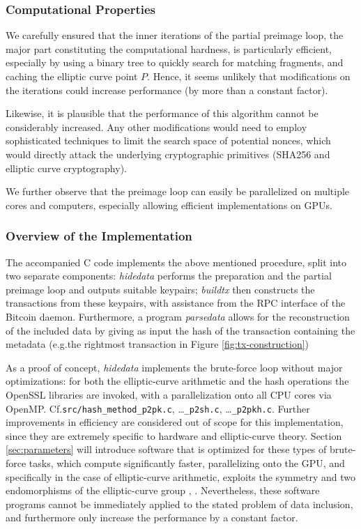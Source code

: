 \documentclass[a4paper,11pt,titlepage]{scrbook}
\begin{document}
\subsubsection*{Computational Properties}

We carefully ensured that the inner iterations of the partial preimage loop, the major part constituting the computational hardness, is particularly efficient, especially by using a binary tree to quickly search for matching fragments, and caching the elliptic curve point $P$.
Hence, it seems unlikely that modifications on the iterations could increase performance (by more than a constant factor).

Likewise, it is plausible that the performance of this algorithm cannot be considerably increased.
Any other modifications would need to employ sophisticated techniques to limit the search space of potential nonces, which would directly attack the underlying cryptographic primitives (SHA256 and elliptic curve cryptography).

We further observe that the preimage loop can easily be parallelized on multiple cores and computers, especially allowing efficient implementations on GPUs.

\subsubsection*{Overview of the Implementation}

The accompanied C code implements the above mentioned procedure, split into two separate components: \emph{hidedata} performs the preparation and the partial preimage loop and outputs suitable keypairs; \emph{buildtx} then constructs the transactions from these keypairs, with assistance from the RPC interface of the Bitcoin daemon.
Furthermore, a program \emph{parsedata} allows for the reconstruction of the included data by giving as input the hash of the transaction containing the metadata (e.g.\@ the rightmost transaction in Figure \ref{fig:tx-construction})

As a proof of concept, \emph{hidedata} implements the brute-force loop without major optimizations: for both the elliptic-curve arithmetic and the hash operations the OpenSSL libraries are invoked, with a parallelization onto all CPU cores via OpenMP. Cf.\@ \texttt{src/hash\_method\allowbreak\_p2pk.c}, \dots\texttt{\_p2sh.c}, \dots\texttt{\_p2pkh.c}.
Further improvements in efficiency are considered out of scope for this implementation, since they are extremely specific to hardware and elliptic-curve theory.
Section \ref{sec:parameters} will introduce software that is optimized for these types of brute-force tasks, which compute significantly faster, parallelizing onto the GPU, and specifically in the case of elliptic-curve arithmetic, exploits the symmetry and two endomorphisms of the elliptic-curve group \cite{vanitysearch_2019}, 
\cite{hashcat_2020}.
Nevertheless, these software programs cannot be immediately applied to the stated problem of data inclusion, and furthermore only increase the performance by a constant factor.
\end{document}
